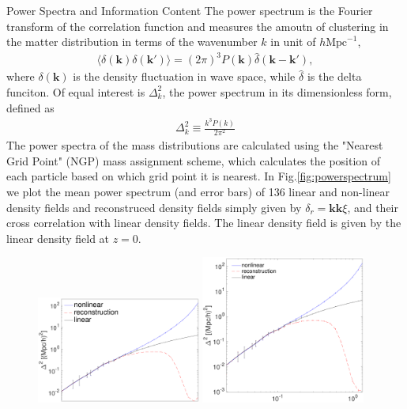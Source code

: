 \begin{section}{Power Spectra and Information Content}
  \label{sec:fisherinfo}
    The power spectrum is the Fourier transform of the correlation function and measures
 the amoutn of clustering in the matter distribution in terms of the wavenumber
 $k$ in unit of $h \mathrm{Mpc}^{-1}$,
\begin{align}
    \langle \delta \left( \bm{k} \right) \delta \left( \bm{k'}\right) \rangle =
\left( 2\pi \right) ^3 P \left( \bm{k} \right) \hat{\delta} \left( \bm{k}-\bm{k'} \right),
\end{align}
where $\delta \left( \bm{k} \right)$ is the density fluctuation in wave space, while 
$\hat{\delta}$ is the delta funciton. Of equal interest is $\Delta ^2_k$, the power 
spectrum in its dimensionless form, defined as
\begin{align}
    \Delta ^2_k \equiv \frac{k^3 P \left( k \right)}{2\pi ^2}
\end{align}
    The power spectra of the mass distributions are calculated using the "Nearest Grid Point" 
(NGP) mass assignment scheme, which calculates the position of each particle based on which 
grid point it is nearest. In Fig.\ref{fig:powerspectrum} we plot the mean power spectrum (and 
error bars) of 136 linear and non-linear density fields and reconstruced density fields simply 
given by $\delta_r=\bm{k}\bm{k}\xi$, and their cross correlation with linear density fields. 
The linear density field is given by the linear density field at $z=0$.
\begin{figure}[t!]
\begin{center}
\includegraphics[width=0.48\textwidth]{powerspectrum_good-crop.pdf}
\includegraphics[width=0.48\textwidth]{power_rectolin-crop.pdf}

\end{center}
\end{figure}
\end{section}
